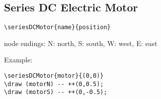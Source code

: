 \documentclass[parskip=full]{scrartcl}
\begin{document}
\subsection{Series DC Electric Motor}

\begin{verbatim}
\seriesDCMotor{name}{position}
\end{verbatim}
node endings: N: north, S: south, W: west, E: east

Example:\\
\begin{minipage}{0.8\textwidth}
\begin{verbatim}
\seriesDCMotor{motor}{(0,0)}
\draw (motorN) -- ++(0,0.5);
\draw (motorS) -- ++(0,-0.5);
\end{verbatim}
\end{minipage}
\begin{minipage}{0.19\textwidth}
\end{minipage}
\end{document}
